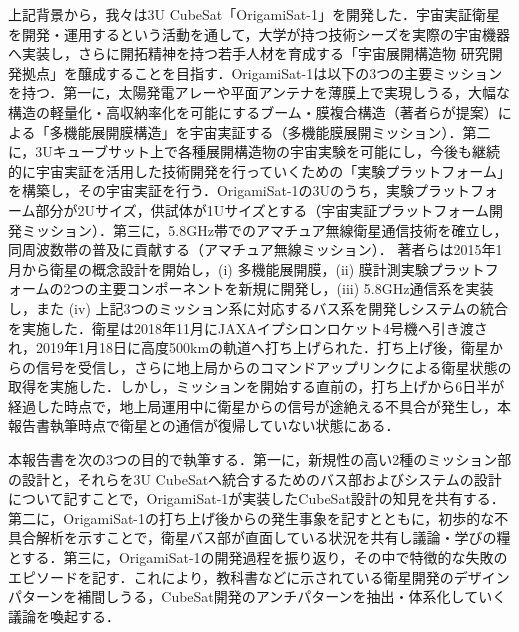 上記背景から，我々は3U CubeSat「OrigamiSat-1」を開発した．宇宙実証衛星を開発・運用するという活動を通して，大学が持つ技術シーズを実際の宇宙機器へ実装し，さらに開拓精神を持つ若手人材を育成する「宇宙展開構造物 研究開発拠点」を醸成することを目指す．OrigamiSat-1は以下の3つの主要ミッションを持つ．第一に，太陽発電アレーや平面アンテナを薄膜上で実現しうる，大幅な構造の軽量化・高収納率化を可能にするブーム・膜複合構造（著者らが提案）による「多機能展開膜構造」を宇宙実証する（多機能膜展開ミッション）．第二に，3Uキューブサット上で各種展開構造物の宇宙実験を可能にし，今後も継続的に宇宙実証を活用した技術開発を行っていくための「実験プラットフォーム」を構築し，その宇宙実証を行う．OrigamiSat-1の3Uのうち，実験プラットフォーム部分が2Uサイズ，供試体が1Uサイズとする（宇宙実証プラットフォーム開発ミッション）．第三に，5.8GHz帯でのアマチュア無線衛星通信技術を確立し，同周波数帯の普及に貢献する（アマチュア無線ミッション）．
著者らは2015年1月から衛星の概念設計を開始し，(i) 多機能展開膜，(ii) 膜計測実験プラットフォームの2つの主要コンポーネントを新規に開発し，(iii) 5.8GHz通信系を実装し，また (iv) 上記3つのミッション系に対応するバス系を開発しシステムの統合を実施した．衛星は2018年11月にJAXAイプシロンロケット4号機へ引き渡され，2019年1月18日に高度500kmの軌道へ打ち上げられた．打ち上げ後，衛星からの信号を受信し，さらに地上局からのコマンドアップリンクによる衛星状態の取得を実施した．しかし，ミッションを開始する直前の，打ち上げから6日半が経過した時点で，地上局運用中に衛星からの信号が途絶える不具合が発生し，本報告書執筆時点で衛星との通信が復帰していない状態にある．


本報告書を次の3つの目的で執筆する．第一に，新規性の高い2種のミッション部の設計と，それらを3U CubeSatへ統合するためのバス部およびシステムの設計について記すことで，OrigamiSat-1が実装したCubeSat設計の知見を共有する．第二に，OrigamiSat-1の打ち上げ後からの発生事象を記すとともに，初歩的な不具合解析を示すことで，衛星バス部が直面している状況を共有し議論・学びの糧とする．第三に，OrigamiSat-1の開発過程を振り返り，その中で特徴的な失敗のエピソードを記す．これにより，教科書などに示されている衛星開発のデザインパターンを補間しうる，CubeSat開発のアンチパターンを抽出・体系化していく議論を喚起する．


